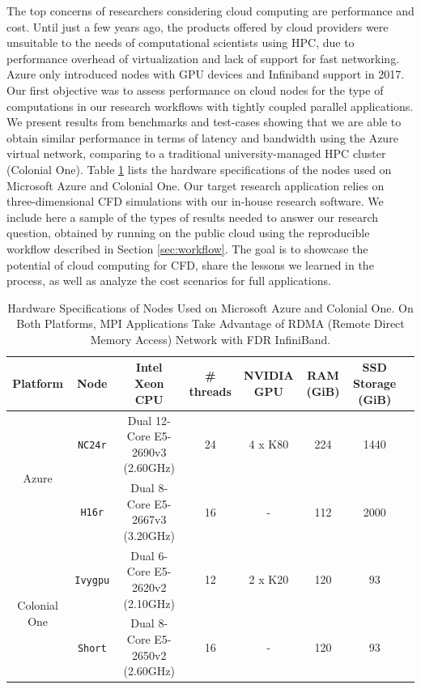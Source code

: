 \documentclass[10pt,journal,compsoc]{IEEEtran}
\begin{document}
The top concerns of researchers considering cloud computing are performance and cost. 
Until just a few years ago, the products offered by cloud providers were unsuitable to the needs of computational scientists using HPC, due to performance overhead of virtualization and lack of support for fast networking. 
Azure only introduced nodes with GPU devices and Infiniband support in 2017. 
Our first objective was to assess performance on cloud nodes for the type of computations in our research workflows with  tightly coupled parallel applications. 
We present results from benchmarks and test-cases showing that we are able to obtain similar performance in terms of latency and bandwidth using the Azure virtual network, comparing to a traditional university-managed HPC cluster (Colonial One).
Table \ref{tab:hw_specs} lists the hardware specifications of the nodes used on Microsoft Azure and Colonial One.
 Our target research application relies on three-dimensional CFD simulations with our in-house research software. We include here a sample of the types of results needed to answer our research question, obtained by running on the public cloud using the reproducible workflow described in Section \ref{sec:workflow}. 
 The goal is to showcase the potential of cloud computing for CFD, share the lessons we learned in the process, as well as analyze the cost scenarios for full applications.


\begin{table}[b]
    \renewcommand{\arraystretch}{1.5}
    \caption{Hardware Specifications of Nodes Used on Microsoft Azure and Colonial One. On Both Platforms, MPI Applications Take Advantage of RDMA (Remote Direct Memory Access) Network with FDR InfiniBand.}
    \label{tab:hw_specs}
    \centering
    \begin{tabular}{cccccccc}
        Platform & Node & Intel Xeon CPU & \# threads & NVIDIA GPU & RAM (GiB) & SSD Storage (GiB) \\
        \hline
        \multirow{2}{*}{Azure} & \texttt{NC24r} & Dual 12-Core E5-2690v3 (2.60GHz) & 24 & 4 x K80 & 224 & 1440 \\
        & \texttt{H16r} & Dual 8-Core E5-2667v3 (3.20GHz) & 16 & - & 112 & 2000 \\
        \hline
        \multirow{2}{*}{Colonial One} & \texttt{Ivygpu} & Dual 6-Core E5-2620v2 (2.10GHz) & 12 & 2 x K20 & 120 & 93 \\
        & \texttt{Short} & Dual 8-Core E5-2650v2 (2.60GHz) & 16 & - & 120 & 93 \\
        \hline
    \end{tabular}
\end{table}
\end{document}
